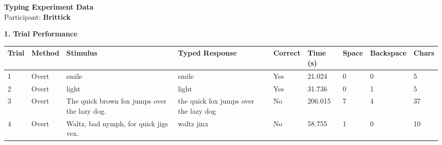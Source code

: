 \documentclass[10pt,a4paper]{article}
\begin{document}

\begin{center}
    {\Large\bfseries Typing Experiment Data}\\
    \vspace{2pt}
    Participant: \textbf{Brittick}
\end{center}

\vspace{0.25cm}


\noindent
{\large\bfseries 1. Trial Performance}

\vspace{0.08cm}

\begin{center}
\begin{tabularx}{\textwidth}{
    C{0.45in}
    C{0.65in}
    L{2.35in}
    L{2.55in}
    C{0.65in}
    C{0.65in}
    C{0.55in}
    C{0.75in}
    C{0.55in}
}
\toprule

\textbf{Trial} &
\textbf{Method} &
\textbf{Stimulus} &
\textbf{Typed Response} &
\textbf{Correct} &
\textbf{Time (s)} &
\textbf{Space} &
\textbf{Backspace} &
\textbf{Chars}
\\

\midrule

1 &
Overt &
smile &
smile &
Yes &
21.024 &
0 &
0 &
5
\\

2 &
Overt &
light &
light &
Yes &
31.736 &
0 &
1 &
5
\\

3 &
Overt &
The quick brown fox jumps over the lazy dog. &
the quick fox jumps over the lazy dog &
No &
206.015 &
7 &
4 &
37
\\

4 &
Overt &
Waltz, bad nymph, for quick jigs vex. &
waltz jinx &
No &
58.755 &
1 &
0 &
10
\\

\bottomrule
\end{tabularx}
\end{center}

\vspace{0.35cm}

\end{document}
